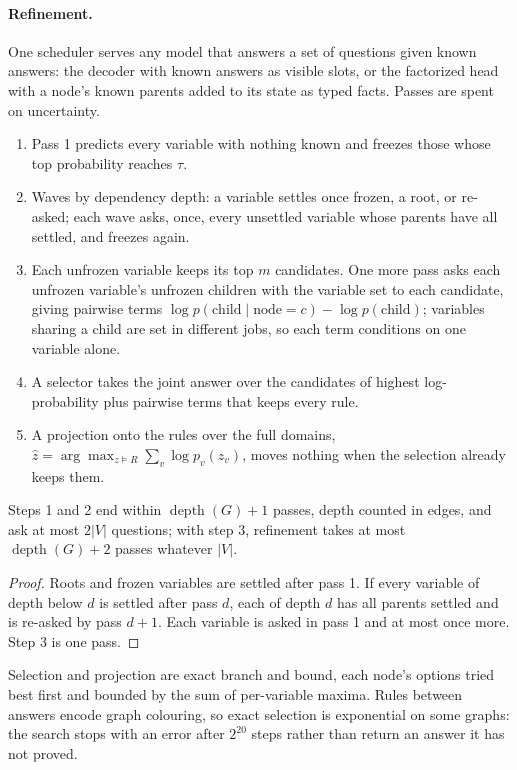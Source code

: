 \paragraph{Refinement.}
One scheduler serves any model that answers a set of questions given known
answers: the decoder with known answers as visible slots, or the factorized
head with a node's known parents added to its state as typed facts. Passes are
spent on uncertainty.
\begin{enumerate}[leftmargin=1.5em]
  \item Pass 1 predicts every variable with nothing known and freezes those
    whose top probability reaches $\tau$.
  \item Waves by dependency depth: a variable settles once frozen, a root, or
    re-asked; each wave asks, once, every unsettled variable whose parents have
    all settled, and freezes again.
  \item Each unfrozen variable keeps its top $m$ candidates. One more pass asks
    each unfrozen variable's unfrozen children with the variable set to each
    candidate, giving pairwise terms
    $\log p(\text{child} \mid \text{node} = c) - \log p(\text{child})$;
    variables sharing a child are set in different jobs, so each term
    conditions on one variable alone.
  \item A selector takes the joint answer over the candidates of highest
    log-probability plus pairwise terms that keeps every rule.
  \item A projection onto the rules over the full domains,
    $\hat z = \arg\max_{z \models R} \sum_{v} \log p_v(z_v)$, moves nothing
    when the selection already keeps them.
\end{enumerate}

\begin{proposition}
\label{prop:depth}
Steps 1 and 2 end within $\operatorname{depth}(G) + 1$ passes, depth counted in
edges, and ask at most $2|V|$ questions; with step 3, refinement takes at most
$\operatorname{depth}(G) + 2$ passes whatever $|V|$.
\end{proposition}
\begin{proof}
Roots and frozen variables are settled after pass 1. If every variable of depth
below $d$ is settled after pass $d$, each of depth $d$ has all parents settled
and is re-asked by pass $d+1$. Each variable is asked in pass 1 and at most once
more. Step 3 is one pass.
\end{proof}

Selection and projection are exact branch and bound, each node's options tried
best first and bounded by the sum of per-variable maxima. Rules between answers
encode graph colouring, so exact selection is exponential on some graphs: the
search stops with an error after $2^{20}$ steps rather than return an answer it
has not proved.

